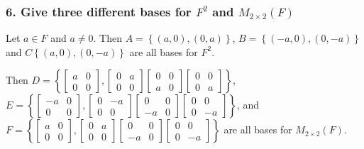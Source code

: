 \documentclass{article}
\begin{document}
\subsubsection*{6. Give three different bases for $F^2$ and $M_{2\times 2}(F)$}

Let $a \in F$ and $a \ne 0$. Then $A = \left\{(a, 0), (0, a)\right\}$, $B = \left\{(-a, 0), (0, -a)\right\}$ and $C \left\{(a, 0), (0, -a)\right\}$ are all bases for $F^2$.

Then $D = \left\{
	\begin{bmatrix}
		a & 0 \\
		0 & 0
	\end{bmatrix},
	\begin{bmatrix}
		0 & a \\
		0 & 0
	\end{bmatrix}
	\begin{bmatrix}
		0 & 0 \\
		a & 0
	\end{bmatrix}
	\begin{bmatrix}
		0 & 0 \\
		0 & a
	\end{bmatrix}
\right\}$,
$E = \left\{
	\begin{bmatrix}
		-a & 0 \\
		0 & 0
	\end{bmatrix},
	\begin{bmatrix}
		0 & -a \\
		0 & 0
	\end{bmatrix}
	\begin{bmatrix}
		0 & 0 \\
		-a & 0
	\end{bmatrix}
	\begin{bmatrix}
		0 & 0 \\
		0 & -a
	\end{bmatrix}
\right\}$, and
$F = \left\{
	\begin{bmatrix}
		a & 0 \\
		0 & 0
	\end{bmatrix},
	\begin{bmatrix}
		0 & a \\
		0 & 0
	\end{bmatrix}
	\begin{bmatrix}
		0 & 0 \\
		-a & 0
	\end{bmatrix}
	\begin{bmatrix}
		0 & 0 \\
		0 & -a
	\end{bmatrix}
\right\}$ are all bases for $M_{2\times 2}(F)$.
\end{document}
